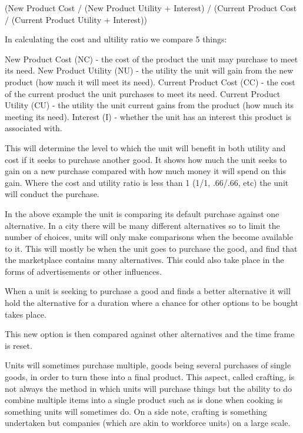 (New Product Cost / (New Product Utility + Interest) / (Current Product Cost / (Current Product Utility + Interest))

In calculating the cost and ultility ratio we compare 5 things:

New Product Cost (NC) - the cost of the product the unit may purchase to meet its need.
New Product Utility (NU) - the utility the unit will gain from the new product (how much it will meet its need).
Current Product Cost (CC) - the cost of the current product the unit purchases to meet its need.
Current Product Utility (CU) - the utility the unit current gains from the product (how much its meeting its need).
Interest (I) - whether the unit has an interest this product is associated with.

This will determine the level to which the unit will benefit in both utility and cost if it seeks to purchase another good. It shows how much the unit seeks to gain on a new purchase compared with how much money it will spend on this gain. Where the cost and utility ratio is less than 1 (1/1, .66/.66, etc) the unit will conduct the purchase.



In the above example the unit is comparing its default purchase against one alternative. In a city there will be many different alternatives so to limit the number of choices, units will only make comparisons when the become available to it. This will mostly be when the unit goes to purchase the good, and find that the marketplace contains many alternatives. This could also take place in the forms of advertisements or other influences.


When a unit is seeking to purchase a good and finds a better alternative it will hold the alternative for a duration where a chance for other options to be bought takes place.

This new option is then compared against other alternatives and the time frame is reset. 


Units will sometimes purchase multiple, goods being several purchases of single goods, in order to turn these into a final product. This aspect, called crafting, is not always the method in which units will purchase things but the ability to do combine multiple items into a single product such as is done when cooking is something units will sometimes do. On a side note, crafting is something undertaken but companies (which are akin to workforce units) on a large scale.

